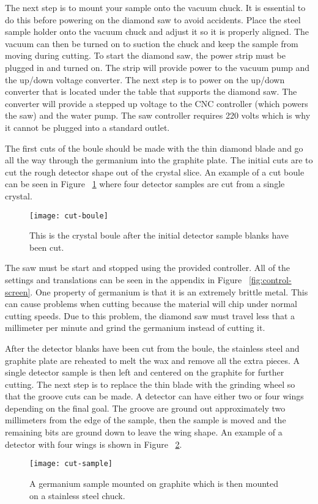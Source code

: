 The next step is to mount your sample onto the vacuum chuck.
It is essential to do this before powering on the diamond saw to avoid accidents.
Place the steel sample holder onto the vacuum chuck and adjust it so it is properly aligned.
The vacuum can then be turned on to suction the chuck and keep the sample from moving during cutting.
To start the diamond saw, the power strip must be plugged in and turned on.
The strip will provide power to the vacuum pump and the up/down voltage converter.
The next step is to power on the up/down converter that is located under the table that supports the diamond saw.
The converter will provide a stepped up voltage to the CNC controller (which powers the saw) and the water pump.
The saw controller requires 220 volts which is why it cannot be plugged into a standard outlet.

The first cuts of the boule should be made with the thin diamond blade and go all the way through the germanium into the graphite plate.
The initial cuts are to cut the rough detector shape out of the crystal slice.
An example of a cut boule can be seen in Figure ~\ref{fig:cutboule} where four detector samples are cut from a single crystal.
\begin{figure}[htpb]
\centering
\texttt{[image: cut-boule]}
\caption{This is the crystal boule after the initial detector sample blanks have been cut.}
\label{fig:cutboule}
\end{figure}
The saw must be start and stopped using the provided controller.
All of the settings and translations can be seen in the appendix in Figure ~\ref{fig:control-screen}.
One property of germanium is that it is an extremely brittle metal.
This can cause problems when cutting because the material will chip under normal cutting speeds.
Due to this problem, the diamond saw must travel less that a millimeter per minute and grind the germanium instead of cutting it.

After the detector blanks have been cut from the boule, the stainless steel and graphite plate are reheated to melt the wax and remove all the extra pieces.
A single detector sample is then left and centered on the graphite for further cutting.
The next step is to replace the thin blade with the grinding wheel so that the groove cuts can be made.
A detector can have either two or four wings depending on the final goal.
The groove are ground out approximately two millimeters from the edge of the sample, then the sample is moved and the remaining bits are ground down to leave the wing shape.
An example of a detector with four wings is shown in Figure ~\ref{fig:cut-sample}.
\begin{figure}[htpb]
\centering
\texttt{[image: cut-sample]}
\caption{A germanium sample mounted on graphite which is then mounted on a stainless steel chuck.}
\label{fig:cut-sample}
\end{figure}

